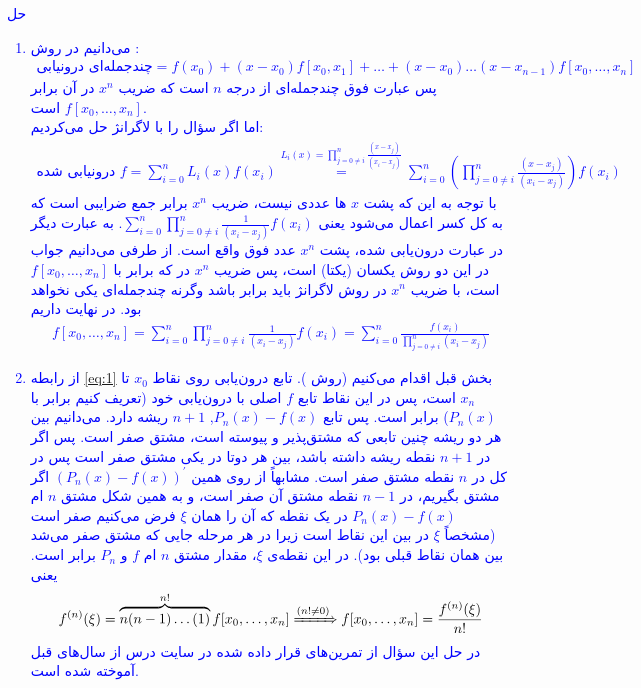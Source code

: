 \textcolor{blue}{حل
\begin{enumerate}
    \item 
    می‌دانیم در روش
    :
    \begin{align} \label{eq:1}
        \text{چندجمله‌ای درونیابی} = f(x_0) + (x - x_0) f[x_0, x_1] + \dots + (x - x_0) \dots (x - x_{n-1}) f[x_0, \dots, x_n]
    \end{align}
    پس عبارت فوق چندجمله‌ای از درجه
    $n$
    است که ضریب 
    $x^n$
    در آن برابر 
    $f[x_0, \dots, x_n]$
    است. 
    \\
    اما اگر سؤال را با لاگرانژ حل می‌کردیم:
    \begin{align*}
    \text{درونیابی شده
    $f$} = \sum_{i = 0}^{n} L_i (x) f(x_i) \stackrel{L_i(x) = \prod_{j = 0 \neq i}^{n} \frac{(x - x_j)}{(x_i - x_j)}}{=} \sum_{i = 0}^{n} (\prod_{j = 0 \neq i}^{n} \frac{(x- x_j)}{(x_i - x_j)}) f(x_i)
    \end{align*}
    با توجه به این که پشت
    $x$
    ها عددی نیست، ضریب 
    $x^n$
    برابر جمع ضرایبی است که به کل کسر اعمال می‌شود یعنی
    $\sum_{i = 0}^{n} \prod_{j = 0 \neq i}^{n} \frac{1}{(x_i - x_j)} f(x_i)$.
    به عبارت دیگر در عبارت درون‌یابی شده، پشت 
    $x^n$
    عدد فوق واقع است. از طرفی می‌دانیم
    جواب
    در این دو روش یکسان (یکتا) است، پس ضریب 
    $x^n$
    در
    که برابر با
    $f[x_0, \dots, x_n]$
    است، با ضریب 
    $x^n$
    در روش لاگرانژ باید برابر باشد وگرنه چندجمله‌ای یکی نخواهد بود. در نهایت داریم
    \begin{align*}
        f[x_0, \dots, x_n] = \sum_{i = 0}^{n} \prod_{j = 0 \neq i}^{n} \frac{1}{(x_i - x_j)} f(x_i) = \sum_{i = 0}^{n} \frac{f(x_i)}{\prod_{j = 0 \neq i}^{n} (x_i - x_j)}
    \end{align*}
    \item 
    از رابطه
    \ref{eq:1}
    بخش قبل اقدام می‌کنیم
    (روش 
    ).
    تابع 
    درون‌یابی روی نقاط
    $x_0$
    تا
    $x_n$
    است، پس در این نقاط تابع
    $f$
    اصلی با درون‌یابی خود (تعریف کنیم برابر با
    $P_n(x)$)
    برابر است. پس تابع
    $P_n(x) - f(x)$,
    $n + 1$
    ریشه دارد. می‌دانیم بین هر دو ریشه چنین تابعی که مشتق‌پذیر و پیوسته است، مشتق صفر است.
    پس اگر در 
    $n + 1$
    نقطه ریشه داشته باشد، بین هر دوتا در یکی مشتق صفر است پس در کل در 
    $n$
    نقطه مشتق صفر است. مشابهاً از روی همین 
    $(P_n(x) - f(x))^{'}$
    اگر مشتق بگیریم، در 
    $n - 1$
    نقطه مشتق آن صفر است، و به همین شکل مشتق 
    $n$
    ام 
    $P_n(x) - f(x)$
    در یک نقطه که آن را همان
    $\xi$
    فرض می‌کنیم صفر است (مشخصاً 
    $\xi$
    در بین این نقاط است زیرا در هر مرحله جایی که مشتق صفر می‌شد بین همان نقاط قبلی بود). در این نقطه‌ی 
    $\xi$،
    مقدار مشتق 
    $n$
    ام 
    $f$
    و
    $P_n$
    برابر است. یعنی
    \begin{align*}
        f^{(n)}(\xi) =\overbrace{n(n-1) \dots (1)}^{n!} f[x_0, \dots,x_n] \xRightarrow{(n! \neq 0)} f[x_0, \dots ,x_n] = \frac{f^{(n)}(\xi)}{n!}
    \end{align*}
    در حل این سؤال از تمرین‌های قرار داده شده در سایت درس از سال‌های قبل آموخته شده است.
\end{enumerate}
}

